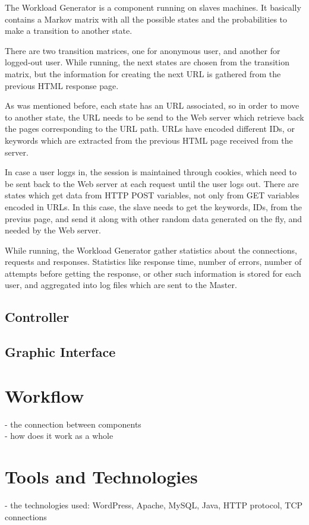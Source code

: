 The Workload Generator is a component running on slaves machines. It basically contains a Markov matrix with all the possible states and the probabilities to make a transition to another state. 

There are two transition matrices, one for anonymous user, and another for logged-out user. While running, the next states are chosen from the transition matrix, but the information for creating the next URL is gathered from the previous HTML response page.

As was mentioned before, each state has an URL associated, so in order to move to another state, the URL needs to be send to the Web server which retrieve back the pages corresponding to the URL path. URLs have encoded different IDs, or keywords which are extracted from the previous HTML page received from the server. 

In case a user loggs in, the session is maintained through cookies, which need to be sent back to the Web server at each request until the user logs out. There are states which get data from HTTP POST variables, not only from GET variables encoded in URLs. In this case, the slave needs to get the keywords, IDs, from the previus page, and send it along with other random data generated on the fly, and needed by the Web server. 

While running, the Workload Generator gather statistics about the connections, requests and responses. Statistics like response time, number of errors, number of attempts before getting the response, or other such information is stored for each user, and aggregated into log files which are sent to the Master.

\subsection{Controller}
\label{sub-sec:controller}

\subsection{Graphic Interface}
\label{sub-sec:graphic-interface}


\section{Workflow}
\label{sec:workflow}

- the connection between components\\
- how does it work as a whole


\section{Tools and Technologies}
\label{sec:tools-and-technologies}

- the technologies used: WordPress, Apache, MySQL, Java, HTTP protocol, TCP connections